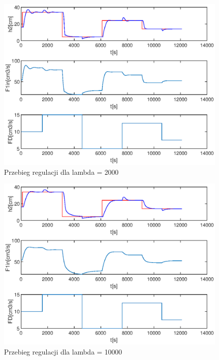 		\begin{figure}
			\includegraphics[width=0.9\linewidth]{plots/z1_dmc_2000.eps}
			\caption{Przebieg regulacji dla lambda = 2000}
			\label{rys:dmc1000}
		\end{figure}
		
		\begin{figure}
			\includegraphics[width=0.9\linewidth]{plots/z1_dmc_10000.eps}
			\caption{Przebieg regulacji dla lambda = 10000}
			\label{rys:dmc10000}
		\end{figure}
	\newpage